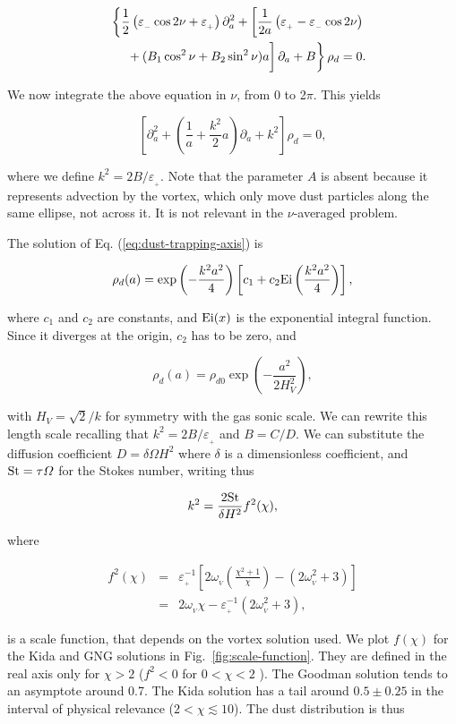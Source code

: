 \documentclass[apj]{emulateapj}
\def\white#1{\textcolor{white}{#1}}
\newcommand{\Eq}[1]{Eq. (\ref{#1})}
\newcommand{\eq}[1]{\Eq{#1}}
\newcommand{\Fig}[1]{Fig.~\ref{#1}}
\newcommand{\fig}[1]{\Fig{#1}}
\newcommand{\beq}{\begin{equation}}
\newcommand{\eeq}{\end{equation}}
\newcommand{\beqn}{\begin{eqnarray}}
\newcommand{\eeqn}{\end{eqnarray}}
\newcommand{\epsp}{\varepsilon_{_{+}}}
\newcommand{\epsm}{\varepsilon_{_{-}}}
\begin{document}
\beqn
&&\left\{\frac{1}{2}\left(\epsm \cos 2\nu +\epsp\right) \partial^2_a  +  \left[\frac{1}{2a}\left( \epsp - \epsm\cos 2\nu\right) \right.\right. \nonumber\\
&&\left.\left.\white{\frac{1}{1}}+ (B_1\cos^2\nu +  B_2\sin^2\nu)a\right] \partial_a  + B\right\} \rho_d = 0. 
\eeqn

We now integrate the above equation in $\nu$, from 0 to 2$\pi$. This yields


\beq\label{eq:dust-trapping-axis}
\left[\partial^2_a  +  \left(\frac{1}{a} +  \frac{k^2}{2}a\right) \partial_a  + k^2\right]\rho_d = 0, 
\eeq

\noindent where we define $k^2=2B/\epsp$. Note that the parameter $A$
is absent because it represents advection by the vortex, which only
move dust particles along the same ellipse, not across it. It is
not relevant in the $\nu$-averaged problem.  

The solution of
\eq{eq:dust-trapping-axis} is 

\beq
\rho_d(a) = \exp\left(-\frac{k^2a^2}{4}\right)  \left[c_1 + c_2 {\rm
    Ei}\left(\frac{k^2a^2}{4}\right)\right],
\eeq

\noindent where $c_1$ and $c_2$ are constants, and ${\rm Ei}(x)$ is
the exponential integral function. Since it diverges at the origin, $c_2$ has to be zero, and 

\beq
\rho_d(a) = \rho_{d0} \exp\left(-\frac{a^2}{2H_V^2}\right),
\eeq

\noindent with $H_V = \sqrt{2}/k$ for symmetry with the gas sonic scale. We can 
rewrite this length scale recalling that $k^2=2B/\epsp$ and
$B=C/D$. We can substitute the diffusion coefficient $D=\delta \varOmega H^2$ where 
$\delta$ is a dimensionless coefficient, and ${\rm St} = \tau\varOmega$ for 
the Stokes number, writing thus 

\beqn
\label{eq:k}
k^2 = \frac{2{\rm St}}{\delta H^2} f^2(\chi),
\eeqn 

\noindent where 

\beqn
f^2(\chi) &=& \epsp^{-1} \left[2\omega_{_V}\left(\frac{\chi^2+1}{\chi}\right) - (2\omega_{_V}^2 + 3) \right]\nonumber \\
          &=& 2\omega_{_V}\chi - \epsp^{-1}(2\omega_{_V}^2 + 3),
\label{eq:scale-function}
\eeqn

\noindent is a scale function, that depends on the vortex solution
used. We plot $f(\chi)$ for the Kida and GNG solutions in
\fig{fig:scale-function}. They are defined in the real axis only for $\chi > 2$ ($f^2
< 0$ for $0 < \chi < 2$ ). The Goodman solution tends to an asymptote
around 0.7. The Kida solution has a  tail around $0.5\pm0.25$ in the
interval of physical relevance ($2 < \chi \lesssim 10$). The dust distribution is thus 
\end{document}
